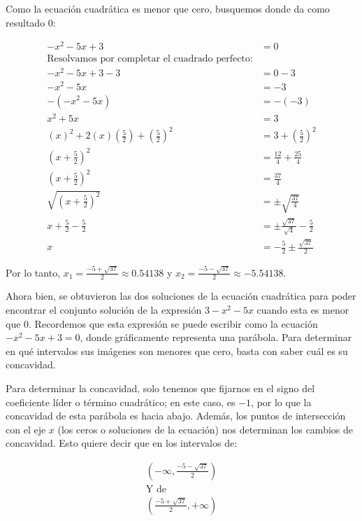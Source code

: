 \documentclass{article}
\begin{document}
\begin{enumerate}
Como la ecuación cuadrática es menor que cero, busquemos donde da como resultado 0:

\begin{align*}
    -x^2 - 5x + 3 &= 0 \\
    \text{Resolvamos por completar el cuadrado perfecto:} \\
    -x^2 - 5x + 3 - 3 &= 0 - 3 \\
    -x^2 - 5x &= -3 \\
    -(-x^2 - 5x) &= -(-3) \\
    x^2 + 5x &= 3 \\
    (x)^2 + 2(x)\left(\frac{5}{2}\right) + \left(\frac{5}{2}\right)^2 &= 3 + \left(\frac{5}{2}\right)^2 \\
    (x + \frac{5}{2})^2 &= \frac{12}{4} + \frac{25}{4} \\
    (x + \frac{5}{2})^2 &= \frac{37}{4} \\
    \sqrt{(x + \frac{5}{2})^2} &= \pm \sqrt{\frac{37}{4}} \\
    x + \frac{5}{2} - \frac{5}{2} &= \pm \frac{\sqrt{37}}{\sqrt{4}} - \frac{5}{2} \\
    x &= -\frac{5}{2} \pm \frac{\sqrt{37}}{2}
\end{align*}

Por lo tanto, $x_1 = \frac{-5 + \sqrt{37}}{2} \approx 0.54138$ y $x_2 = \frac{-5 - \sqrt{37}}{2} \approx -5.54138$.

Ahora bien, se obtuvieron las dos soluciones de la ecuación cuadrática para poder encontrar el conjunto solución de la expresión $3 - x^2 - 5x$ cuando esta es menor que 0. Recordemos que esta expresión se puede escribir como la ecuación $-x^2 - 5x + 3 = 0$, donde gráficamente representa una parábola. Para determinar en qué intervalos sus imágenes son menores que cero, basta con saber cuál es su concavidad.

Para determinar la concavidad, solo tenemos que fijarnos en el signo del coeficiente líder o término cuadrático; en este caso, es \(-1\), por lo que la concavidad de esta parábola es hacia abajo. Además, los puntos de intersección con el eje \(x\) (los ceros o soluciones de la ecuación) nos determinan los cambios de concavidad. Esto quiere decir que en los intervalos de:

\[
\begin{aligned}
    (-\infty, \frac{-5 - \sqrt{37}}{2}) \\
\text{Y de} \\
    (\frac{-5 + \sqrt{37}}{2}, +\infty)
\end{aligned}
\]


\end{enumerate}
\end{document}
